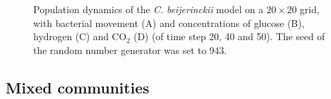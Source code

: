 \begin{figure}[h!]
{\begin{minipage}[t]{0.3\textwidth}
  \end{minipage}
  }
  \caption{Population dynamics of the \emph{C. beijerinckii} model on a $20\times20$ grid, with bacterial movement (A) and concentrations of glucose (B), hydrogen (C) and CO$_2$ (D) (of time step 20, 40 and 50). The seed of the random number generator was set to 943.}
  \label{fig:beijergrids}
\end{figure}

\subsection{Mixed communities}
